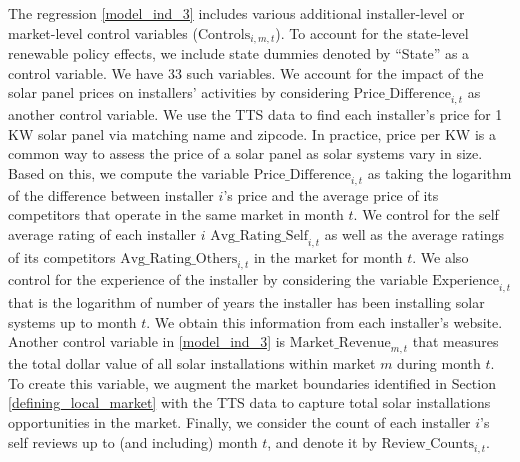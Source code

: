 \documentclass[msom,blindrev]{informs3}
\begin{document}
 The regression \eqref{model_ind_3} includes various additional installer-level or market-level control variables ($\text{Controls}_{i,m,t}$). To account for the state-level renewable policy effects, we include state dummies denoted by ``State'' as a control variable. We have 33 such variables. We account for the impact of the solar panel prices on installers' activities by considering $\text{Price\_Difference}_{i,t}$ as another control variable. We use the TTS data to find each installer's price for 1 KW solar panel via matching name and zipcode. In practice, price per KW is a common way to assess the price of a solar panel as solar systems vary in size. Based on this, we compute the variable $\text{Price\_Difference}_{i,t}$ as taking the logarithm of the difference between installer $i$'s price and the average price of its competitors that operate in the same market in month $t$.  We control for the self average rating of each installer $i$ $\text{Avg\_Rating\_Self}_{i,t}$  as well as the average ratings of its competitors $\text{Avg\_Rating\_Others}_{i,t}$ in the market for month $t$. We also control for the experience of the installer by considering the variable $\text{Experience}_{i,t}$ that is the logarithm of number of years the installer has been installing solar systems up to month $t$. We obtain this information from each installer's website. Another control variable in \eqref{model_ind_3} is $\text{Market\_Revenue}_{m,t}$  that measures the total dollar value of all solar installations within market $m$ during month $t$. To create this variable, we augment the market boundaries identified in Section \ref{defining_local_market} with the TTS data to capture total  solar installations opportunities in the market. Finally, we consider the count of each installer $i$'s self reviews up to (and including) month $t$, and denote it by $\text{Review\_Counts}_{i,t}$.





%
\end{document}
